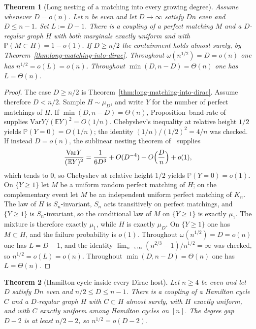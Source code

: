 \documentclass[11pt]{article}
\newtheorem{theorem}{Theorem}
\newcommand{\EE}{\mathbb{E}}
\newcommand{\PP}{\mathbb{P}}
\newcommand{\Var}{\mathrm{Var}}
\begin{document}
\begin{theorem}[Long nesting of a matching into every growing degree]
\label{thm:long-matching-growing}
Assume~\cite[Theorem~6]{Gao20} whenever \(D=o(n)\). Let \(n\) be even and let
\(D\to\infty\) satisfy \(Dn\) even and \(D\le n-1\). Set \(L:=D-1\). There is a
coupling of a perfect matching \(M\) and a \(D\)-regular graph \(H\) with both
marginals exactly uniform and with \(\PP(M\subset H)=1-o(1)\). If \(D\ge n/2\) the
containment holds almost surely, by Theorem~\ref{thm:long-matching-into-dirac}.
Throughout \(\omega(n^{1/2})=D=o(n)\) one has \(n^{1/2}=o(L)=o(n)\).
Throughout \(\min(D,n-D)=\Theta(n)\) one has \(L=\Theta(n)\).
\end{theorem}

\begin{proof}
The case \(D\ge n/2\) is Theorem~\ref{thm:long-matching-into-dirac}.
Assume therefore \(D<n/2\). Sample \(H\sim\mu_D\), and write \(Y\) for the number of
perfect matchings of \(H\).
If \(\min(D,n-D)=\Theta(n)\), Proposition~band-rate of~\cite{PlusOneV1} supplies
\(\Var Y/(\EE Y)^2=O(1/n)\). Chebyshev's inequality at relative height \(1/2\) yields
\(\PP(Y=0)=O(1/n)\); the identity \((1/n)/(1/2)^2=4/n\) was checked.
If instead \(D=o(n)\), the sublinear nesting theorem of~\cite{PlusOneV1} supplies
\[
\frac{\Var Y}{(\EE Y)^2}
=
\frac1{6D^3}+O(D^{-4})+O\Bigl(\frac{D}{n}\Bigr)+o(1),
\]
which tends to \(0\), so Chebyshev at relative height \(1/2\) yields \(\PP(Y=0)=o(1)\).
On \(\{Y\ge 1\}\) let \(M\) be a uniform random perfect matching of \(H\); on the
complementary event let \(M\) be an independent uniform perfect matching of \(K_n\).
The law of \(H\) is \(S_n\)-invariant, \(S_n\) acts transitively on perfect matchings,
and \(\{Y\ge 1\}\) is \(S_n\)-invariant, so the conditional law of \(M\) on
\(\{Y\ge 1\}\) is exactly \(\mu_1\). The mixture is therefore exactly \(\mu_1\), while
\(H\) is exactly \(\mu_D\). On \(\{Y\ge 1\}\) one has \(M\subset H\), and the failure
probability is \(o(1)\).
Throughout \(\omega(n^{1/2})=D=o(n)\) one has \(L=D-1\), and the identity
\(\lim_{n\to\infty}(n^{2/3}-1)/n^{1/2}=\infty\) was checked, so
\(n^{1/2}=o(L)=o(n)\).
Throughout \(\min(D,n-D)=\Theta(n)\) one has \(L=\Theta(n)\).
\end{proof}

\begin{theorem}[Hamilton cycle inside every Dirac host]
\label{thm:long-hamilton-dirac}
Let \(n\ge 4\) be even and let \(D\) satisfy \(Dn\) even and \(n/2\le D\le n-1\).
There is a coupling of a Hamilton cycle \(C\) and a \(D\)-regular graph \(H\) with
\(C\subset H\) almost surely, with \(H\) exactly uniform, and with \(C\) exactly uniform
among Hamilton cycles on \([n]\). The degree gap \(D-2\) is at least \(n/2-2\), so
\(n^{1/2}=o(D-2)\).
\end{theorem}
\end{document}
